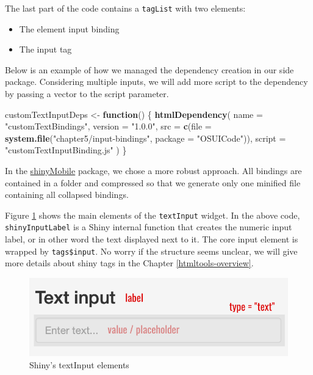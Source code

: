 \documentclass[
]{book}
\newenvironment{Shaded}{\begin{snugshade}}{\end{snugshade}}
\newcommand{\ControlFlowTok}[1]{\textcolor[rgb]{0.13,0.29,0.53}{\textbf{#1}}}
\newcommand{\DataTypeTok}[1]{\textcolor[rgb]{0.13,0.29,0.53}{#1}}
\newcommand{\KeywordTok}[1]{\textcolor[rgb]{0.13,0.29,0.53}{\textbf{#1}}}
\newcommand{\NormalTok}[1]{#1}
\newcommand{\StringTok}[1]{\textcolor[rgb]{0.31,0.60,0.02}{#1}}
\providecommand{\tightlist}{%
  \setlength{\itemsep}{0pt}\setlength{\parskip}{0pt}}
\begin{document}
The last part of the code contains a \texttt{tagList} with two elements:

\begin{itemize}
\tightlist
\item
  The element input binding
\item
  The input tag
\end{itemize}

Below is an example of how we managed the dependency creation in our side package.
Considering multiple inputs, we will add more script to the dependency by passing a vector to the script parameter.

\begin{Shaded}
\begin{Highlighting}[]
\NormalTok{customTextInputDeps <-}\StringTok{ }\ControlFlowTok{function}\NormalTok{() \{}
  \KeywordTok{htmlDependency}\NormalTok{(}
    \DataTypeTok{name =} \StringTok{"customTextBindings"}\NormalTok{,}
    \DataTypeTok{version =} \StringTok{"1.0.0"}\NormalTok{,}
    \DataTypeTok{src =} \KeywordTok{c}\NormalTok{(}\DataTypeTok{file =} \KeywordTok{system.file}\NormalTok{(}\StringTok{"chapter5/input-bindings"}\NormalTok{, }\DataTypeTok{package =} \StringTok{"OSUICode"}\NormalTok{)),}
    \DataTypeTok{script =} \StringTok{"customTextInputBinding.js"}
\NormalTok{  )}
\NormalTok{\}}
\end{Highlighting}
\end{Shaded}

In the \href{https://github.com/RinteRface/shinyMobile/tree/master/inst/framework7-5.5.0}{shinyMobile} package, we chose a more robust approach. All bindings are contained in a folder and compressed so that we generate only one minified file containing all collapsed bindings.

Figure \ref{fig:text-input} shows the main elements of the \texttt{textInput} widget. In the above code, \texttt{shinyInputLabel} is a Shiny internal function that creates the numeric input label, or in other word the text displayed next to it. The core input element is wrapped by \texttt{tags\$input}. No worry if the structure seems unclear, we will give more details about shiny tags in the Chapter \ref{htmltools-overview}.

\begin{figure}
\includegraphics[width=9.72in]{images/survival-kit/text-input} \caption{Shiny's textInput elements}\label{fig:text-input}
\end{figure}
\end{document}
